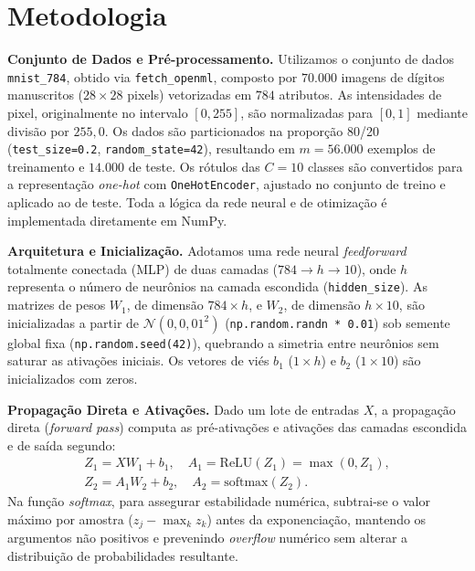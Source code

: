 \section{Metodologia}

\noindent\textbf{Conjunto de Dados e Pré-processamento.}
Utilizamos o conjunto de dados \texttt{mnist\_784}, obtido via \texttt{fetch\_openml}, composto por $70.000$ imagens de dígitos manuscritos ($28 \times 28$ pixels) vetorizadas em $784$ atributos. As intensidades de pixel, originalmente no intervalo $[0, 255]$, são normalizadas para $[0, 1]$ mediante divisão por $255{,}0$. Os dados são particionados na proporção 80/20 (\texttt{test\_size=0.2}, \texttt{random\_state=42}), resultando em $m = 56.000$ exemplos de treinamento e $14.000$ de teste. Os rótulos das $C = 10$ classes são convertidos para a representação \emph{one-hot} com \texttt{OneHotEncoder}, ajustado no conjunto de treino e aplicado ao de teste. Toda a lógica da rede neural e de otimização é implementada diretamente em NumPy.

\noindent\textbf{Arquitetura e Inicialização.}
Adotamos uma rede neural \emph{feedforward} totalmente conectada (MLP) de duas camadas ($784 \to h \to 10$), onde $h$ representa o número de neurônios na camada escondida (\texttt{hidden\_size}). As matrizes de pesos $W_1$, de dimensão $784 \times h$, e $W_2$, de dimensão $h \times 10$, são inicializadas a partir de $\mathcal{N}(0, 0{,}01^2)$ (\texttt{np.random.randn * 0.01}) sob semente global fixa (\texttt{np.random.seed(42)}), quebrando a simetria entre neurônios sem saturar as ativações iniciais. Os vetores de viés $b_1$ ($1 \times h$) e $b_2$ ($1 \times 10$) são inicializados com zeros.

\noindent\textbf{Propagação Direta e Ativações.}
Dado um lote de entradas $X$, a propagação direta (\emph{forward pass}) computa as pré-ativações e ativações das camadas escondida e de saída segundo:
\begin{gather*}
Z_1 = X W_1 + b_1, \quad A_1 = \text{ReLU}(Z_1) = \max(0, Z_1), \\
Z_2 = A_1 W_2 + b_2, \quad A_2 = \text{softmax}(Z_2).
\end{gather*}
Na função \emph{softmax}, para assegurar estabilidade numérica, subtrai-se o valor máximo por amostra ($z_j - \max_k z_k$) antes da exponenciação, mantendo os argumentos não positivos e prevenindo \emph{overflow} numérico sem alterar a distribuição de probabilidades resultante.

